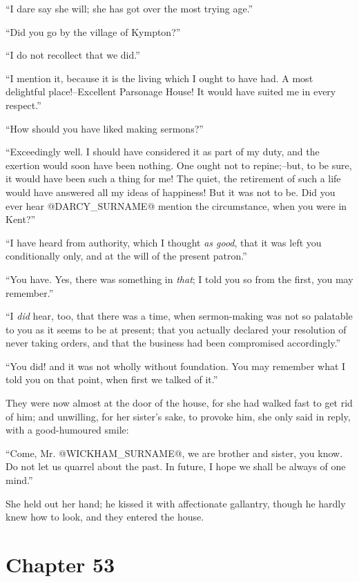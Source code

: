 ``I dare say she will; she has got over the most trying age.''

``Did you go by the village of Kympton?''

``I do not recollect that we did.''

``I mention it, because it is the living which I ought to have had. A
most delightful place!--Excellent Parsonage House! It would have suited
me in every respect.''

``How should you have liked making sermons?''

``Exceedingly well. I should have considered it as part of my duty,
and the exertion would soon have been nothing. One ought not to
repine;--but, to be sure, it would have been such a thing for me! The
quiet, the retirement of such a life would have answered all my ideas
of happiness! But it was not to be. Did you ever hear @DARCY_SURNAME@ mention the
circumstance, when you were in Kent?''

``I have heard from authority, which I thought \textit{as good}, that it was
left you conditionally only, and at the will of the present patron.''

``You have. Yes, there was something in \textit{that}; I told you so from the
first, you may remember.''

``I \textit{did} hear, too, that there was a time, when sermon-making was not
so palatable to you as it seems to be at present; that you actually
declared your resolution of never taking orders, and that the business
had been compromised accordingly.''

``You did! and it was not wholly without foundation. You may remember
what I told you on that point, when first we talked of it.''

They were now almost at the door of the house, for she had walked fast
to get rid of him; and unwilling, for her sister's sake, to provoke him,
she only said in reply, with a good-humoured smile:

``Come, Mr. @WICKHAM_SURNAME@, we are brother and sister, you know. Do not let
us quarrel about the past. In future, I hope we shall be always of one
mind.''

She held out her hand; he kissed it with affectionate gallantry, though
he hardly knew how to look, and they entered the house.



\chapter*{Chapter 53}



